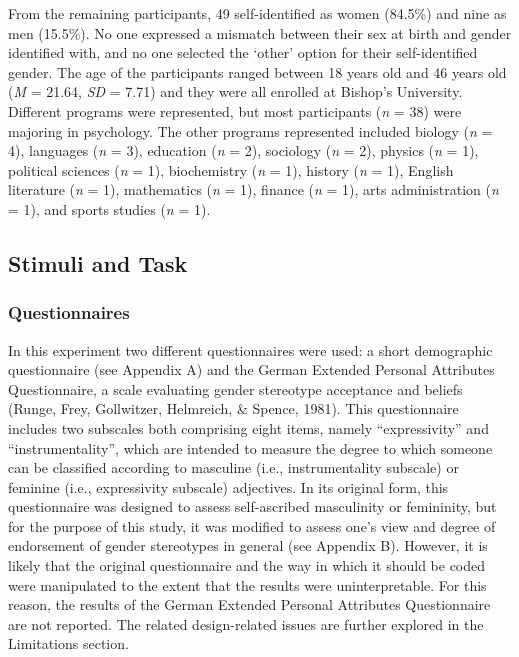 \documentclass[authordate, serif, review]{jote-article}
\begin{document}
\begin{multicols}{2}
From the remaining participants, 49 self-identified as women (84.5\%) and nine as men (15.5\%). No one expressed a mismatch between their sex at birth and gender identified with, and no one selected the `other' option for their self-identified gender. The age of the participants ranged between 18 years old and 46 years old (\textit{M }= 21.64, \textit{SD }= 7.71) and they were all enrolled at Bishop's University. Different programs were represented, but most participants (\textit{n} = 38) were majoring in psychology. The other programs represented included biology (\textit{n} = 4), languages (\textit{n} = 3), education (\textit{n} = 2), sociology (\textit{n} = 2), physics (\textit{n} = 1), political sciences (\textit{n} = 1), biochemistry (\textit{n} = 1), history (\textit{n} = 1), English literature (\textit{n} = 1), mathematics (\textit{n} = 1), finance (\textit{n} = 1), arts administration (\textit{n} = 1), and sports studies (\textit{n} = 1).  

\subsection*{Stimuli and Task}

\subsubsection*{Questionnaires} In this experiment two different questionnaires were used: a short demographic questionnaire (see Appendix A) and the German Extended Personal Attributes Questionnaire, a scale evaluating gender stereotype acceptance and beliefs (Runge, Frey, Gollwitzer, Helmreich, \& Spence, 1981). This questionnaire includes two subscales both comprising eight items, namely ``expressivity'' and ``instrumentality'', which are intended to measure the degree to which someone can be classified according to masculine (i.e., instrumentality subscale) or feminine (i.e., expressivity subscale) adjectives. In its original form, this questionnaire was designed to assess self-ascribed masculinity or femininity, but for the purpose of this study, it was modified to assess one's view and degree of endorsement of gender stereotypes in general (see Appendix B). However, it is likely that the original questionnaire and the way in which it should be coded were manipulated to the extent that the results were uninterpretable. For this reason, the results of the German Extended Personal Attributes Questionnaire are not reported. The related design-related issues are further explored in the Limitations section.


\end{multicols}
\end{document}
